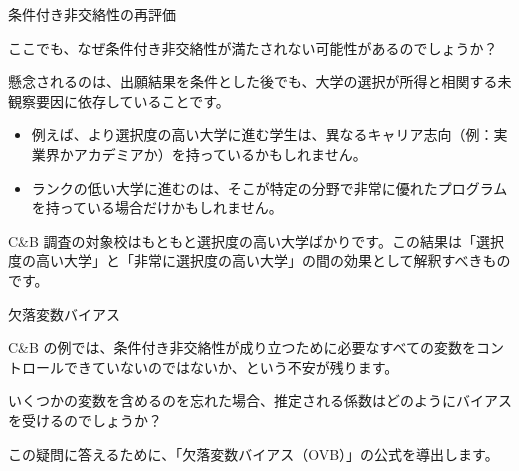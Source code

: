 \documentclass[11pt,handout]{beamer}
\newenvironment{wideitemizeshort}{\itemize}{\enditemize}
\begin{document}
\begin{frame}{条件付き非交絡性の再評価}

\begin{wideitemizeshort}
	\item
	ここでも、なぜ条件付き非交絡性が満たされない可能性があるのでしょうか？
	
	\pause
	\item
	懸念されるのは、出願結果を条件とした後でも、大学の選択が所得と相関する未観察要因に依存していることです。 \smallskip

		\begin{itemize}
			\item
			例えば、より選択度の高い大学に進む学生は、異なるキャリア志向（例：実業界かアカデミアか）を持っているかもしれません。
			
			\pause
			\item
			ランクの低い大学に進むのは、そこが特定の分野で非常に優れたプログラムを持っている場合だけかもしれません。
			
	 \end{itemize}
 
 	\pause
 	\item
 	C\&B 調査の対象校はもともと選択度の高い大学ばかりです。この結果は「選択度の高い大学」と「非常に選択度の高い大学」の間の効果として解釈すべきものです。
\end{wideitemizeshort}
	
\end{frame}


\begin{frame}{欠落変数バイアス}
	\begin{wideitemizeshort}
		\item
		C\&B の例では、条件付き非交絡性が成り立つために必要なすべての変数をコントロールできていないのではないか、という不安が残ります。
		
		\pause
		\item
		いくつかの変数を含めるのを忘れた場合、推定される係数はどのようにバイアスを受けるのでしょうか？
		
		\pause
		\item
		この疑問に答えるために、「欠落変数バイアス（OVB）」の公式を導出します。
	\end{wideitemizeshort}
\end{frame}
\end{document}
